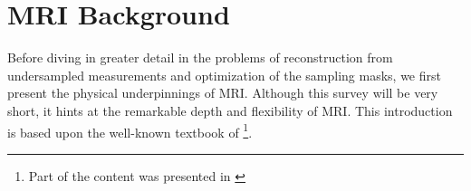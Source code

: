 \chapter{MRI Background}\label{ch:mri_background}
Before diving in greater detail in the problems of reconstruction from undersampled measurements and optimization of the sampling masks, we first present the physical underpinnings of MRI. Although this survey will be very short, it hints at the remarkable depth and flexibility of MRI. This introduction is based upon the well-known textbook of \citet{brown2014magnetic}\footnote{Part of the content was presented in \citet{sanchez2018master}}.



